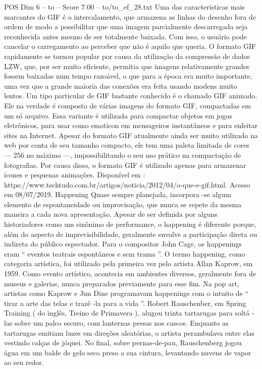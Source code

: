 \begin{textsample}{POS Dim 6 – to – Score 7.00 – to/to\_ef\_28.txt}
Uma das características mais marcantes do GIF é o intercalamento, que armazena as linhas do desenho fora de ordem de modo a possibilitar que uma imagem parcialmente descarregada seja reconhecida antes mesmo de ser totalmente baixada.
Com isso, o usuário pode cancelar o carregamento ao perceber que não é aquilo que queria.
O formato GIF rapidamente se tornou popular por causa da utilização da compressão de dados LZW, que, por ser muito eficiente, permitia que imagens relativamente grandes fossem baixadas num tempo razoável, o que para a época era muito importante, uma vez que a grande maioria das conexões era feita usando modens muito lentos.
Um tipo particular de GIF bastante conhecido é o chamado GIF animado.
Ele na verdade é composto de várias imagens do formato GIF, compactadas em um só arquivo.
Essa variante é utilizada para compactar objetos em jogos eletrônicos, para usar como emoticon em mensageiros instantâneos e para enfeitar sites na Internet.
Apesar do formato GIF atualmente ainda ser muito utilizado na web por conta de seu tamanho compacto, ele tem uma paleta limitada de cores — 256 no máximo —, impossibilitando o seu uso prático na compactação de fotografias.
Por causa disso, o formato GIF é utilizado apenas para armazenar ícones e pequenas animações.
Disponível em : https://www.techtudo.com.br/artigos/noticia/2012/04/o-que-e-gif.html.
Acesso em 08/07/2019.
Happening Quase sempre planejada, incorpora -se algum elemento de espontaneidade ou improvisação, que nunca se repete da mesma maneira a cada nova apresentação.
Apesar de ser definida por alguns historiadores como um sinônimo de performance, o happening é diferente porque, além do aspecto de imprevisibilidade, geralmente envolve a participação direta ou indireta do público espectador.
Para o compositor John Cage, os happenings eram “ eventos teatrais espontâneos e sem trama ”.
O termo happening, como categoria artística, foi utilizado pela primeira vez pelo artista Allan Kaprow, em 1959.
Como evento artístico, acontecia em ambientes diversos, geralmente fora de museus e galerias, nunca preparados previamente para esse fim.
Na pop art, artistas como Kaprow e Jim Dine programavam happenings com o intuito de “ tirar a arte das telas e trazê -la para a vida ”.
Robert Rauschenber, em Spring Training ( do inglês, Treino de Primavera ), alugou trinta tartarugas para soltá -las sobre um palco escuro, com lanternas presas nos cascos.
Enquanto as tartarugas emitiam luzes em direções aleatórias, o artista perambulava entre elas vestindo calças de jóquei.
No final, sobre pernas-de-pau, Rauschenberg jogou água em um balde de gelo seco preso a sua cintura, levantando nuvens de vapor ao seu redor.

\end{textsample}
